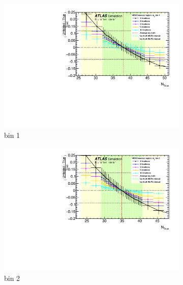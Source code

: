 \begin{itemize}
{    \begin{figure}[htb]
        \centering
        \begin{subfigure}{.48\textwidth}
            \centering
            \includegraphics[width=.9\linewidth]{figures/Analysis/Unfolding/unfolding_bias_mjj_VBSEnh_bin1.pdf}
            \caption{ bin 1}
        \end{subfigure}
        \begin{subfigure}{.48\textwidth}
            \centering
            \includegraphics[width=.9\linewidth]{figures/Analysis/Unfolding/unfolding_bias_mjj_VBSEnh_bin2.pdf}
            \caption{bin 2 }
        \end{subfigure}\\
        \begin{subfigure}{.48\textwidth}
            \centering

\end{subfigure}
\end{figure}}
\end{itemize}
